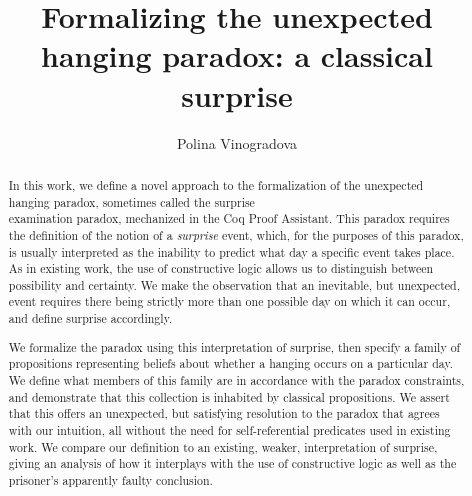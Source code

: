 \documentclass[runningheads]{llncs}
\begin{document}
%
\title{Formalizing the unexpected hanging paradox: a classical surprise} %
%
%
\author{Polina Vinogradova }
%
%
%
\maketitle              %
%
\begin{abstract}

  In this work, we define a novel approach to the formalization of the
  unexpected hanging paradox, sometimes called the surprise \\
  examination paradox,
  mechanized in the Coq Proof Assistant.
  This paradox requires the definition of the notion of
  a \emph{surprise} event, which, for the purposes of this paradox, is usually interpreted as
  the inability to predict what day a specific event takes place. As in existing work,
  the use of constructive logic allows us to distinguish between possibility and
  certainty.
  We make the observation that an inevitable, but unexpected, event requires there being strictly
  more than one possible day on which it can occur, and define surprise accordingly.

  We
  formalize the paradox using this interpretation of surprise, then
  specify a family of
  propositions representing beliefs about whether a hanging occurs on a particular day.
  We define what members of this family are in accordance with the paradox constraints, and
  demonstrate that this collection is inhabited by classical propositions.
  We assert that this offers an unexpected, but satisfying resolution to the paradox that
  agrees with
  our intuition, all without the need for self-referential predicates used in existing work.
  We compare our definition to an existing, weaker, interpretation of surprise,
  giving an analysis of how it interplays with the use of constructive logic
  as well as the prisoner's apparently faulty conclusion.

\end{abstract}
%
\end{document}
